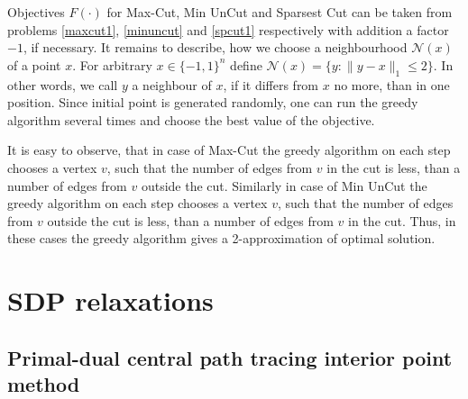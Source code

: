 \documentclass[12pt]{article}
\begin{document}
Objectives $F(\cdot)$ for Max-Cut, Min UnCut and Sparsest Cut can be taken from 
problems \ref{maxcut1}, \ref{minuncut} and \ref{spcut1}  respectively with addition a 
factor $-1$, if necessary.
It remains to describe, how we choose a neighbourhood $\mathcal N(x)$ of a point $x$.
For arbitrary $x \in \{-1, 1 \}^n$ define $\mathcal N(x) = \{ y : \| y - x \|_1 \leq 2 \}$.
In other words, we call $y$ a neighbour of $x$, if it differs from $x$ no more, than in one 
position.
Since initial point is generated randomly, one can run the greedy algorithm several times 
and choose the best value of the objective.

It is easy to observe, that in case of Max-Cut the greedy algorithm on each step chooses 
a vertex $v$, such that the number of edges from $v$ in the cut is less, than a number of 
edges from $v$ outside the cut.
Similarly in case of Min UnCut the greedy algorithm on each step chooses 
a vertex $v$, such that the number of edges from $v$ outside the cut is less, than a 
number of edges from $v$ in the cut.
Thus, in these cases the greedy algorithm gives a 2-approximation of optimal solution.





\section{SDP relaxations}



\subsection{Primal-dual central path tracing interior point method}
\end{document}
